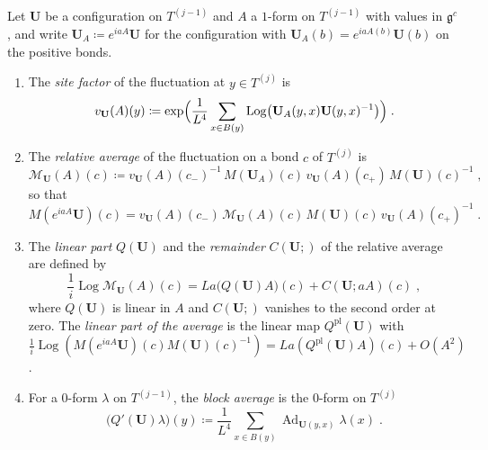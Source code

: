 \documentclass[11pt]{preprint}
\makeatletter
\newcommand{\Ad}{\operatorname{Ad}}
\newcommand*{\bigcdot}{}%
\DeclareRobustCommand*{\bigcdot}{%
	\mathbin{\mathpalette\bigcdot@{}}%
}
\newcommand*{\bigcdot@scalefactor}{.7}
\newcommand*{\bigcdot@widthfactor}{1.15}
\newcommand*{\bigcdot@}[2]{%
	\sbox0{$#1\vcenter{}$}%
	\sbox2{$#1\cdot\m@th$}%
	\hbox to \bigcdot@widthfactor\wd2{%
		\hss
		\raise\ht0\hbox{%
			\scalebox{\bigcdot@scalefactor}{%
				\lower\ht0\hbox{$#1\bullet\m@th$}%
			}%
		}%
		\hss
	}%
}
\numberwithin{equation}{section}
\makeatother
\begin{document}
\begin{definition}\label{def:relative-average}
Let $\mathbf U$ be a configuration on $T^{(j-1)}$ and $A$ a $1$-form on $T^{(j-1)}$ with values in $\mathfrak g^c$, and write $\mathbf U_A \coloneqq e^{iaA}\mathbf U$ for the configuration with $\mathbf U_A(b) = e^{iaA(b)}\mathbf U(b)$ on the positive bonds.
\begin{enumerate}[label=(\roman*)]
\item The \emph{site factor} of the fluctuation at $y \in T^{(j)}$ is
\begin{equation}\label{eq:site-factor}
    v_{\mathbf U}(A)(y) \coloneqq \exp\Bigl(\frac{1}{L^4}\sum_{x \in B(y)}\operatorname{Log}\bigl(\mathbf U_A(y, x)\mathbf U(y, x)^{-1}\bigr)\Bigr)\;.
\end{equation}
\item The \emph{relative average} of the fluctuation on a bond $c$ of $T^{(j)}$ is
\begin{equation}\label{eq:relative-average}
    \mathcal M_{\mathbf U}(A)(c) \coloneqq v_{\mathbf U}(A)(c_-)^{-1}\,M(\mathbf U_A)(c)\,v_{\mathbf U}(A)(c_+)\,M(\mathbf U)(c)^{-1}\;,
\end{equation}
so that
\begin{equation}\label{eq:average-of-product}
    M(e^{iaA}\mathbf U)(c) = v_{\mathbf U}(A)(c_-)\,\mathcal M_{\mathbf U}(A)(c)\,M(\mathbf U)(c)\,v_{\mathbf U}(A)(c_+)^{-1}\;.
\end{equation}
\item The \emph{linear part} $Q(\mathbf U)$ and the \emph{remainder} $C(\mathbf U; \bigcdot)$ of the relative average are defined by
\begin{equation}\label{eq:linear-part}
    \frac{1}{i}\operatorname{Log}\mathcal M_{\mathbf U}(A)(c) = La\bigl(Q(\mathbf U)A\bigr)(c) + C(\mathbf U; aA)(c)\;,
\end{equation}
where $Q(\mathbf U)$ is linear in $A$ and $C(\mathbf U; \bigcdot)$ vanishes to the second order at zero. The \emph{linear part of the average} is the linear map $Q^{\mathrm{pl}}(\mathbf U)$ with $\frac{1}{i}\operatorname{Log}(M(e^{iaA}\mathbf U)(c)M(\mathbf U)(c)^{-1}) = La(Q^{\mathrm{pl}}(\mathbf U)A)(c) + O(A^2)$.
\item For a $0$-form $\lambda$ on $T^{(j-1)}$, the \emph{block average} is the $0$-form on $T^{(j)}$
\begin{equation}\label{eq:block-average}
    \bigl(Q'(\mathbf U)\lambda\bigr)(y) \coloneqq \frac{1}{L^4}\sum_{x \in B(y)}\Ad_{\mathbf U(y, x)}\lambda(x)\;.
\end{equation}
\end{enumerate}
\end{definition}
\end{document}
